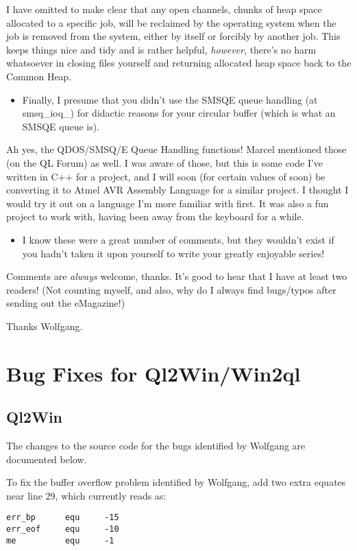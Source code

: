 I have omitted to make clear that any open channels, chunks of heap
space allocated to a specific job, will be reclaimed by the operating
system when the job is removed from the system, either by itself or
forcibly by another job. This keeps things nice and tidy and is rather
helpful, \emph{however}, there's no harm whatsoever in closing files
yourself and returning allocated heap space back to the Common Heap.
\begin{itemize}
\item Finally, I presume that you didn't use the SMSQE queue handling (at
smsq\_ioq\_) for didactic reasons for your circular buffer (which
is what an SMSQE queue is).
\end{itemize}
Ah yes, the QDOS/SMSQ/E Queue Handling functions! Marcel mentioned
those (on the QL Forum) as well. I was aware of those, but this is
some code I've written in C++ for a project, and I will soon (for
certain values of soon) be converting it to Atmel AVR Assembly Language
for a similar project. I thought I would try it out on a language
I'm more familiar with first. It was also a fun project to work with,
having been away from the keyboard for a while.
\begin{itemize}
\item I know these were a great number of comments, but they wouldn't exist
if you hadn't taken it upon yourself to write your greatly enjoyable
series!
\end{itemize}
Comments are \emph{always} welcome, thanks. It's good to hear that
I have at least two readers! (Not counting myself, and also, why do
I always find bugs/typos after sending out the eMagazine!)

Thanks Wolfgang.

\section{Bug Fixes for Ql2Win/Win2ql}

\subsection{Ql2Win}

The changes to the source code for the bugs identified by Wolfgang
are documented below.

To fix the buffer overflow problem identified by Wolfgang, add two
extra equates near line 29, which currently reads as:

\begin{lstlisting}[showstringspaces=false,tabsize=4]
err_bp      equ     -15
err_eof     equ     -10
me          equ     -1
\end{lstlisting}

